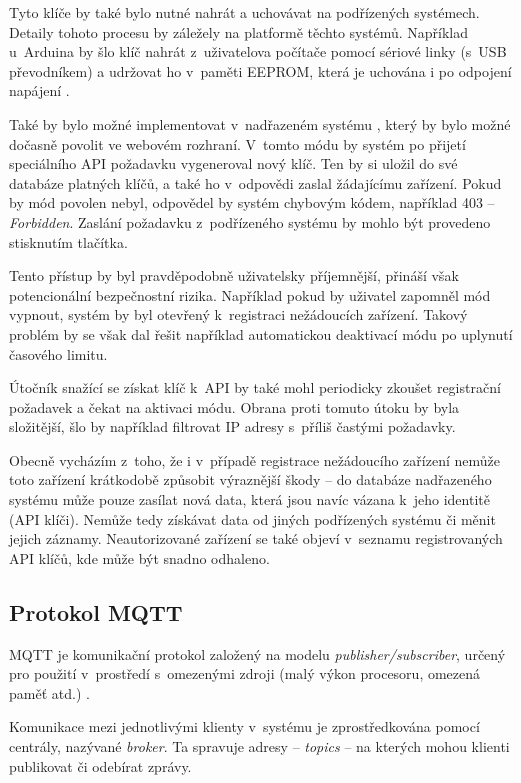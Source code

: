 Tyto klíče by také bylo nutné nahrát a uchovávat na podřízených systémech. Detaily tohoto procesu by záležely na platformě těchto systémů. Například u~Arduina by šlo klíč nahrát z~uživatelova počítače pomocí sériové linky (s~USB převodníkem) a udržovat ho v~paměti EEPROM, která je uchována i po odpojení napájení \cite{ard_eeprom}.

Také by bylo možné implementovat v~nadřazeném systému , který by bylo možné dočasně povolit ve webovém rozhraní. V~tomto módu by systém po přijetí speciálního API požadavku vygeneroval nový klíč. Ten by si uložil do své databáze platných klíčů, a také ho v~odpovědi zaslal žádajícímu zařízení. Pokud by mód povolen nebyl, odpovědel by systém chybovým kódem, například 403 -- \textit{Forbidden}. Zaslání požadavku z~podřízeného systému by mohlo být provedeno stisknutím tlačítka.

Tento přístup by byl pravděpodobně uživatelsky příjemnější, přináší však potencionální bezpečnostní rizika. Například pokud by uživatel zapomněl mód vypnout, systém by byl otevřený k~registraci nežádoucích zařízení. Takový problém by se však dal řešit například automatickou deaktivací módu po uplynutí časového limitu.

Útočník snažící se získat klíč k~API by také mohl periodicky zkoušet registrační požadavek a čekat na aktivaci módu. Obrana proti tomuto útoku by byla složitější, šlo by například filtrovat IP adresy s~příliš častými požadavky.

Obecně vycházím z~toho, že i v~případě registrace nežádoucího zařízení nemůže toto zařízení krátkodobě způsobit výraznější škody -- do databáze nadřazeného systému může pouze zasílat nová data, která jsou navíc vázana k~jeho identitě (API klíči). Nemůže tedy získávat data od jiných podřízených systému či měnit jejich záznamy. Neautorizované zařízení se také objeví v~seznamu registrovaných API klíčů, kde může být snadno odhaleno. 

\subsection{Protokol MQTT}
\label{sec:an_mqtt}

MQTT je komunikační protokol založený na modelu \textit{publisher/subscriber}, určený pro použití v~prostředí s~omezenými zdroji (malý výkon procesoru, omezená paměť atd.) \cite{mqtt_valerie}.

Komunikace mezi jednotlivými klienty v~systému je zprostředkována pomocí centrály, nazývané \textit{broker}. Ta spravuje adresy -- \textit{topics} -- na kterých mohou klienti publikovat či odebírat zprávy.

